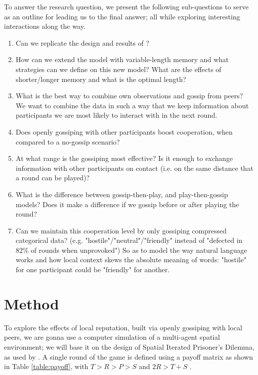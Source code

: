 \documentclass[english]{article}
\begin{document}
To answer the research question, we present the following sub-questions to serve as an outline for leading us to the final answer; all while exploring interesting interactions along the way.
\begin{enumerate}
  \item Can we replicate the design and results of \citet{smaldino}?
  \item How can we extend the model with variable-length memory and what strategies can we define on this new model? What are the effects of shorter/longer memory and what is the optimal length?
  \item What is the best way to combine own observations and gossip from peers? We want to combine the data in such a way that we keep information about participants we are most likely to interact with in the next round.
  \item Does openly gossiping with other participants boost cooperation, when compared to a no-gossip scenario?
  \item At what range is the gossiping most effective? Is it enough to exchange information with other participants on contact (i.e. on the same distance that a round can be played)?
  \item What is the difference between gossip-then-play, and play-then-gossip models? Does it make a difference if we gossip before or after playing the round?
  \item Can we maintain this cooperation level by only gossiping compressed categorical data? (e.g. "hostile"/"neutral"/"friendly" instead of "defected in 82\% of rounds when unprovoked") So as to model the way natural language works and how local context skews the absolute meaning of words: "hostile" for one participant could be "friendly" for another.
\end{enumerate}



\section*{Method}
To explore the effects of local reputation, built via openly gossiping with local peers, we are gonna use a computer simulation of a multi-agent spatial environment; we will base it on the design of Spatial Iterated Prisoner’s Dilemma, as used by \citet{smaldino}.
A single round of the game is defined using a payoff matrix as shown in Table \ref{table:payoff}, with $T > R > P > S$ and $2R > T + S$ \citep{chammah1965}.
\end{document}
